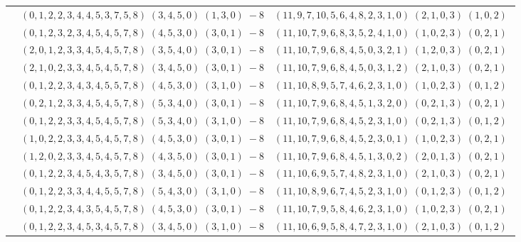 \documentclass[11pt]{article}
\begin{document}
\begin{longtable}[l]{|c|c|c|}
 \cline{2-3} 
 & $(0 ,1 ,2 ,2 ,3 ,4 ,4 ,5 ,3 ,7 ,5 ,8) \;(3 ,4 ,5 ,0) \;(1 ,3 ,0) \;-8$ & $(11 ,9 ,7 ,10 ,5 ,6 ,4 ,8 ,2 ,3 ,1 ,0) \;(2 ,1 ,0 ,3) \;(1 ,0 ,2) \;$\\ 
 \cline{2-3} 
 & $(0 ,1 ,2 ,3 ,2 ,3 ,4 ,5 ,4 ,5 ,7 ,8) \;(4 ,5 ,3 ,0) \;(3 ,0 ,1) \;-8$ & $(11 ,10 ,7 ,9 ,6 ,8 ,3 ,5 ,2 ,4 ,1 ,0) \;(1 ,0 ,2 ,3) \;(0 ,2 ,1) \;$\\ 
 \cline{2-3} 
 & $(2 ,0 ,1 ,2 ,3 ,3 ,4 ,5 ,4 ,5 ,7 ,8) \;(3 ,5 ,4 ,0) \;(3 ,0 ,1) \;-8$ & $(11 ,10 ,7 ,9 ,6 ,8 ,4 ,5 ,0 ,3 ,2 ,1) \;(1 ,2 ,0 ,3) \;(0 ,2 ,1) \;$\\ 
 \cline{2-3} 
 & $(2 ,1 ,0 ,2 ,3 ,3 ,4 ,5 ,4 ,5 ,7 ,8) \;(3 ,4 ,5 ,0) \;(3 ,0 ,1) \;-8$ & $(11 ,10 ,7 ,9 ,6 ,8 ,4 ,5 ,0 ,3 ,1 ,2) \;(2 ,1 ,0 ,3) \;(0 ,2 ,1) \;$\\ 
 \cline{2-3} 
 & $(0 ,1 ,2 ,2 ,3 ,4 ,3 ,4 ,5 ,5 ,7 ,8) \;(4 ,5 ,3 ,0) \;(3 ,1 ,0) \;-8$ & $(11 ,10 ,8 ,9 ,5 ,7 ,4 ,6 ,2 ,3 ,1 ,0) \;(1 ,0 ,2 ,3) \;(0 ,1 ,2) \;$\\ 
 \cline{2-3} 
 & $(0 ,2 ,1 ,2 ,3 ,3 ,4 ,5 ,4 ,5 ,7 ,8) \;(5 ,3 ,4 ,0) \;(3 ,0 ,1) \;-8$ & $(11 ,10 ,7 ,9 ,6 ,8 ,4 ,5 ,1 ,3 ,2 ,0) \;(0 ,2 ,1 ,3) \;(0 ,2 ,1) \;$\\ 
 \cline{2-3} 
 & $(0 ,1 ,2 ,2 ,3 ,3 ,4 ,5 ,4 ,5 ,7 ,8) \;(5 ,3 ,4 ,0) \;(3 ,1 ,0) \;-8$ & $(11 ,10 ,7 ,9 ,6 ,8 ,4 ,5 ,2 ,3 ,1 ,0) \;(0 ,2 ,1 ,3) \;(0 ,1 ,2) \;$\\ 
 \cline{2-3} 
 & $(1 ,0 ,2 ,2 ,3 ,3 ,4 ,5 ,4 ,5 ,7 ,8) \;(4 ,5 ,3 ,0) \;(3 ,0 ,1) \;-8$ & $(11 ,10 ,7 ,9 ,6 ,8 ,4 ,5 ,2 ,3 ,0 ,1) \;(1 ,0 ,2 ,3) \;(0 ,2 ,1) \;$\\ 
 \cline{2-3} 
 & $(1 ,2 ,0 ,2 ,3 ,3 ,4 ,5 ,4 ,5 ,7 ,8) \;(4 ,3 ,5 ,0) \;(3 ,0 ,1) \;-8$ & $(11 ,10 ,7 ,9 ,6 ,8 ,4 ,5 ,1 ,3 ,0 ,2) \;(2 ,0 ,1 ,3) \;(0 ,2 ,1) \;$\\ 
 \cline{2-3} 
 & $(0 ,1 ,2 ,2 ,3 ,4 ,5 ,4 ,3 ,5 ,7 ,8) \;(3 ,4 ,5 ,0) \;(3 ,0 ,1) \;-8$ & $(11 ,10 ,6 ,9 ,5 ,7 ,4 ,8 ,2 ,3 ,1 ,0) \;(2 ,1 ,0 ,3) \;(0 ,2 ,1) \;$\\ 
 \cline{2-3} 
 & $(0 ,1 ,2 ,2 ,3 ,3 ,4 ,4 ,5 ,5 ,7 ,8) \;(5 ,4 ,3 ,0) \;(3 ,1 ,0) \;-8$ & $(11 ,10 ,8 ,9 ,6 ,7 ,4 ,5 ,2 ,3 ,1 ,0) \;(0 ,1 ,2 ,3) \;(0 ,1 ,2) \;$\\ 
 \cline{2-3} 
 & $(0 ,1 ,2 ,2 ,3 ,4 ,3 ,5 ,4 ,5 ,7 ,8) \;(4 ,5 ,3 ,0) \;(3 ,0 ,1) \;-8$ & $(11 ,10 ,7 ,9 ,5 ,8 ,4 ,6 ,2 ,3 ,1 ,0) \;(1 ,0 ,2 ,3) \;(0 ,2 ,1) \;$\\ 
 \cline{2-3} 
 & $(0 ,1 ,2 ,2 ,3 ,4 ,5 ,3 ,4 ,5 ,7 ,8) \;(3 ,4 ,5 ,0) \;(3 ,1 ,0) \;-8$ & $(11 ,10 ,6 ,9 ,5 ,8 ,4 ,7 ,2 ,3 ,1 ,0) \;(2 ,1 ,0 ,3) \;(0 ,1 ,2) \;$\\ 

\end{longtable}
\end{document}
